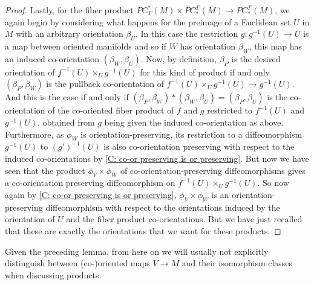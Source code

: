 \begin{proof}
	Lastly, for the fiber product $PC^*_\Gamma(M) \times PC_*^\Gamma(M) \to PC_*^\Gamma(M)$, we again begin by considering what happens for the preimage of a Euclidean set $U$ in $M$ with an arbitrary orientation $\beta_U$.
	In this case the restriction $g \colon g^{-1}(U) \to U$ is a map between oriented manifolds and so if $W$ has orientation $\beta_W$, this map has an induced co-orientation $(\beta_W, \beta_U)$.
	Now, by definition, $\beta_P$ is the desired orientation of $f^{-1}(U) \times_U g^{-1}(U)$ for this kind of product if and only $(\beta_P,\beta_W)$ is the pullback co-orientation of $f^{-1}(U) \times_U g^{-1}(U) \to g^{-1}(U)$.
	And this is the case if and only if $(\beta_P,\beta_W)*(\beta_W,\beta_U) = (\beta_P, \beta_U)$ is the co-orientation of the co-oriented fiber product of $f$ and $g$ restricted to $f^{-1}(U)$ and $g^{-1}(U)$, obtained from $g$ being given the induced co-orientation as above.
	Furthermore, as $\phi_W$ is orientation-preserving, its restriction to a diffeomorphism $g^{-1}(U)$ to $(g')^{-1}(U)$ is also co-orientation preserving with respect to the induced co-orientations by \cref{C: co-or preserving is or preserving}.
	But now we have seen that the product $\phi_V \times \phi_W$ of co-orientation-preserving diffeomorphisms gives a co-orientation preserving diffeomorphism on $f^{-1}(U) \times_U g^{-1}(U)$.
	So now again by \cref{C: co-or preserving is or preserving}, $\phi_V \times \phi_W$ is an orientation-preserving diffeomorphism with respect to the orientations induced by the orientation of $U$ and the fiber product co-orientations.
	But we have just recalled that these are exactly the orientations that we want for these products.
\end{proof}

\begin{comment}
	\begin{remark}\label{R: product preserves reverse}
		It is easy to modify the preceding arguments to show that if exactly one of $\phi_V \colon V \to V'$ or $\phi_W \colon W \to W'$ is an orientation- or co-orientation-\textit{reversing} diffeomorphism, then $\phi_V \times \phi_W$ restricts to a corresponding orientation- or co-orientation-\textit{reversing} diffeomorphism $V \times_M W \to V' \times_M W'$.
	\end{remark}
\end{comment}

Given the preceding lemma, from here on we will usually not explicitly distinguish between (co\nobreakdash-)oriented maps $V \to M$ and their isomorphism classes when discussing products.






